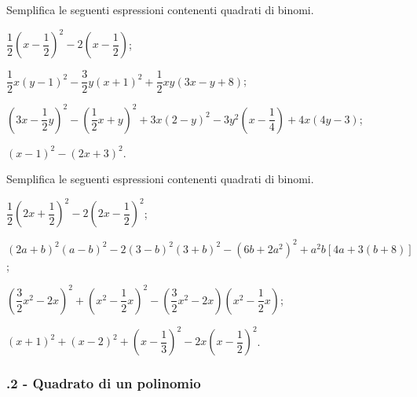 \begin{esercizio}[\Ast]
 \label{ese:12.9}
Semplifica le seguenti espressioni contenenti quadrati di binomi.

\begin{enumeratea}
 \item $\dfrac{1}{2}\left(x-\dfrac{1}{2}\right)^{2}-2\left(x-\dfrac{1}{2}\right)$;
 \item $\dfrac{1}{2}x(y-1)^{2}-\dfrac{3}{2}y(x+1)^{2}+\dfrac{1}{2}{xy}(3x-y+8)$;
 \item $\left(3x-\dfrac{1}{2}y\right)^{2}-\left(\dfrac{1}{2}x+y\right)^{2}+3x(2-y)^{2}-3y^{2}\left(x-\dfrac{1}{4}\right)+4x(4y-3)$;
 \item $\left(x-1\right)^{2}-\left(2x+3\right)^{2}$.
\end{enumeratea}
\end{esercizio}

\begin{esercizio}[\Ast]
 \label{ese:12.10}
Semplifica le seguenti espressioni contenenti quadrati di binomi.

\begin{enumeratea}
 \item $\dfrac{1}{2}\left(2x+\dfrac{1}{2}\right)^{2}-2\left(2x-\dfrac{1}{2}\right)^{2}$;
 \item $(2a+b)^{2}(a-b)^{2}-2(3-b)^{2}(3+b)^{2}-(6b+2a^{2})^{2}+a^{2}b[4a+3(b+8)]$;
 \item $\left(\dfrac{3}{2}x^{2}-2x\right)^{2}+\left(x^{2}-\dfrac{1}{2}x\right)^{2}-\left(\dfrac{3}{2}x^{2}-2x\right)\left(x^{2}-\dfrac{1}{2}x\right)$;
 \item $(x+1)^{2}+(x-2)^{2}+\left(x-\dfrac{1}{3}\right)^{2}-2x\left(x-\dfrac{1}{2}\right)^{2}$.
\end{enumeratea}
\end{esercizio}

\subsubsection*{\thechapter.2 - Quadrato di un polinomio}

